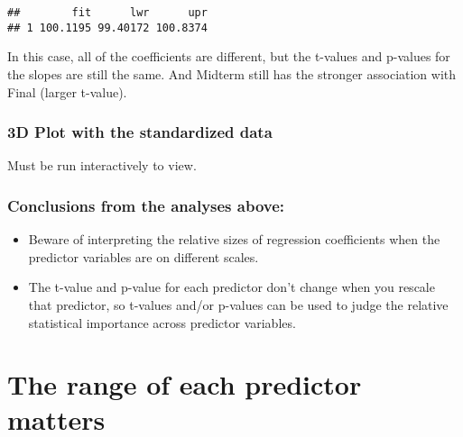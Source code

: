\documentclass[
]{article}
\newenvironment{Shaded}{\begin{snugshade}}{\end{snugshade}}
\newcommand{\AttributeTok}[1]{\textcolor[rgb]{0.77,0.63,0.00}{#1}}
\newcommand{\FunctionTok}[1]{\textcolor[rgb]{0.00,0.00,0.00}{#1}}
\newcommand{\NormalTok}[1]{#1}
\newcommand{\SpecialCharTok}[1]{\textcolor[rgb]{0.00,0.00,0.00}{#1}}
\newcommand{\StringTok}[1]{\textcolor[rgb]{0.31,0.60,0.02}{#1}}
\providecommand{\tightlist}{%
  \setlength{\itemsep}{0pt}\setlength{\parskip}{0pt}}
\begin{document}
\begin{verbatim}
##        fit      lwr      upr
## 1 100.1195 99.40172 100.8374
\end{verbatim}

In this case, all of the coefficients are different, but the t-values
and p-values for the slopes are still the same. And Midterm still has
the stronger association with Final (larger t-value).

\hypertarget{d-plot-with-the-standardized-data}{%
\subsubsection{3D Plot with the standardized
data}\label{d-plot-with-the-standardized-data}}

Must be run interactively to view.

\begin{Shaded}
\end{Shaded}

\hypertarget{conclusions-from-the-analyses-above}{%
\subsubsection{Conclusions from the analyses
above:}\label{conclusions-from-the-analyses-above}}

\begin{itemize}
\tightlist
\item
  Beware of interpreting the relative sizes of regression coefficients
  when the predictor variables are on different scales.
\item
  The t-value and p-value for each predictor don't change when you
  rescale that predictor, so t-values and/or p-values can be used to
  judge the relative statistical importance across predictor variables.
\end{itemize}

\hypertarget{the-range-of-each-predictor-matters}{%
\section{The range of each predictor
matters}\label{the-range-of-each-predictor-matters}}
\end{document}
